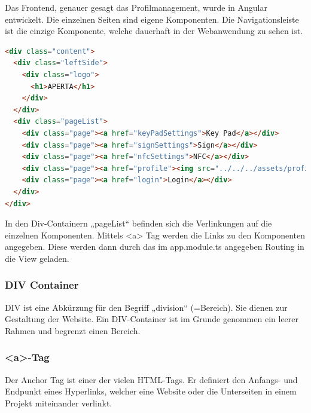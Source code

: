 Das Frontend, genauer gesagt das Profilmanagement, wurde in Angular entwickelt. Die einzelnen Seiten sind eigene Komponenten. Die Navigationsleiste ist die einzige Komponente, welche dauerhaft in der Webanwendung zu sehen ist.
\begin{lstlisting}[language=html, caption=Navigationsleiste Komponente]
    <div class="content">
  <div class="leftSide">
    <div class="logo">
      <h1>APERTA</h1>
    </div>
  </div>
  <div class="pageList">
    <div class="page"><a href="keyPadSettings">Key Pad</a></div>
    <div class="page"><a href="signSettings">Sign</a></div>
    <div class="page"><a href="nfcSettings">NFC</a></div>
    <div class="page"><a href="profile"><img src="../../../assets/profil.png"> </a></div>
    <div class="page"><a href="login">Login</a></div>
  </div>
</div>
\end{lstlisting}

In den Div-Containern „pageList“ befinden sich die Verlinkungen auf die einzelnen Komponenten. Mittels <a> Tag werden die Links zu den Komponenten angegeben. Diese werden dann durch das im app.module.ts angegeben Routing in die View geladen.

\subsubsection{DIV Container}

DIV ist eine Abkürzung für den Begriff „division“ (=Bereich). Sie dienen zur Gestaltung der Website. Ein DIV-Container ist im Grunde genommen ein leerer Rahmen und begrenzt einen Bereich. 
\cite{DivContainer}

\subsubsection{<a>-Tag}
Der Anchor Tag ist einer der vielen HTML-Tags. Er definiert den Anfangs- und Endpunkt eines Hyperlinks, welcher eine Website oder die Unterseiten in einem Projekt miteinander verlinkt. 
\cite{ATag}

